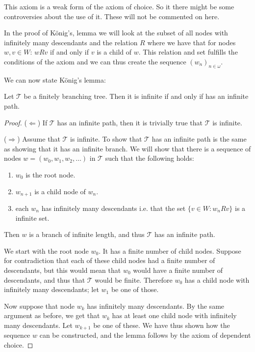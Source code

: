 \documentclass[../main.tex]{subfiles}
\begin{document}
This axiom is a weak form of the axiom of choice. So it there might be some
controversies about the use of it. These will not be commented on here.


In the proof of König's,
lemma we will look at the subset of all nodes with infinitely many descendants
and the relation $R$ where we have that for nodes $w,v\in W$:  $wRv$ if and only if $v$ is a child of $w$. This relation and
set
fulfills the conditions of the axiom and we can thus create the sequence
$(w_n)_{n\in\omega}$.

We can now state König's lemma:
\begin{lemma}
	\label{lem:kong}
	Let $\mathcal{T}$ be a finitely branching tree. Then it is infinite if
	and only if has an infinite path.
\end{lemma}
\begin{proof}
	($\Leftarrow$)
	If $\mathcal{T}$ has an infinite path, then it is trivially true that
	$\mathcal{T}$ is infinite. 

	($\Rightarrow$) Assume that $\mathcal{T}$ is infinite. To show that
	$\mathcal{T}$ has an infinite path is the same as showing that it has
	an infinite branch. We will show that there is a sequence of nodes
	$w=(w_0,w_1,w_2,\ldots)$ in $\mathcal{T}$ such that the following holds:
	\begin{enumerate}
		\item $w_0$ is the root node.
		\item $w_{n+1}$ is a child node of $w_n$.
		\item each $w_n$ has infinitely many descendants i.e. that the
			set $\{v\in W:w_nRv\}$ is a infinite set.
	\end{enumerate}
	Then $w$ is a branch of infinite length, and thus $\mathcal{T}$ has an
	infinite path.

	We start with the root node $w_0$. It has a finite number of child
	nodes. Suppose for contradiction that each of these child nodes had a
	finite number of descendants, but this would mean that $w_0$ would have
	a finite number of descendants, and thus that $\mathcal{T}$ would be
	finite. Therefore $w_0$ has a child node with infinitely many
	descendants; let $w_1$ be one of those.

	Now suppose that node $w_k$ has infinitely many descendants. By the
	same argument as before, we get that $w_k$ has at least one child node
	with infinitely many descendants. Let $w_{k+1}$ be one of these. We have
	thus shown how the sequence $w$ can be constructed, and the lemma
	follows by the axiom of dependent choice.
\end{proof}
\end{document}
